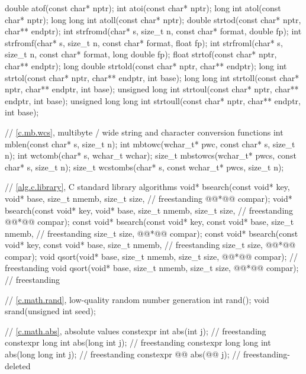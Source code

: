 \begin{codeblock}
{  double atof(const char* nptr);
  int atoi(const char* nptr);
  long int atol(const char* nptr);
  long long int atoll(const char* nptr);
  double strtod(const char* nptr, char** endptr);
  int strfromd(char* s, size_t n, const char* format, double fp);
  int strfromf(char* s, size_t n, const char* format, float fp);
  int strfroml(char* s, size_t n, const char* format, long double fp);
  float strtof(const char* nptr, char** endptr);
  long double strtold(const char* nptr, char** endptr);
  long int strtol(const char* nptr, char** endptr, int base);
  long long int strtoll(const char* nptr, char** endptr, int base);
  unsigned long int strtoul(const char* nptr, char** endptr, int base);
  unsigned long long int strtoull(const char* nptr, char** endptr, int base);

  // \ref{c.mb.wcs}, multibyte / wide string and character conversion functions
  int mblen(const char* s, size_t n);
  int mbtowc(wchar_t* pwc, const char* s, size_t n);
  int wctomb(char* s, wchar_t wchar);
  size_t mbstowcs(wchar_t* pwcs, const char* s, size_t n);
  size_t wcstombs(char* s, const wchar_t* pwcs, size_t n);

  // \ref{alg.c.library}, C standard library algorithms
  void* bsearch(const void* key, void* base, size_t nmemb, size_t size,         // freestanding
                @@*@\itcorr[-1]@ compar);
  void* bsearch(const void* key, void* base, size_t nmemb, size_t size,         // freestanding
                @@*@\itcorr[-1]@ compar);
  const void* bsearch(const void* key, const void* base, size_t nmemb,          // freestanding
                      size_t size, @@*@\itcorr[-1]@ compar);
  const void* bsearch(const void* key, const void* base, size_t nmemb,          // freestanding
                      size_t size, @@*@\itcorr[-1]@ compar);
  void qsort(void* base, size_t nmemb, size_t size, @@*@\itcorr[-1]@ compar);    // freestanding
  void qsort(void* base, size_t nmemb, size_t size, @@*@\itcorr[-1]@ compar);      // freestanding

  // \ref{c.math.rand}, low-quality random number generation
  int rand();
  void srand(unsigned int seed);

  // \ref{c.math.abs}, absolute values
  constexpr int abs(int j);                                             // freestanding
  constexpr long int abs(long int j);                                   // freestanding
  constexpr long long int abs(long long int j);                         // freestanding
  constexpr @@ abs(@@ j);             // freestanding-deleted

}
\end{codeblock}
